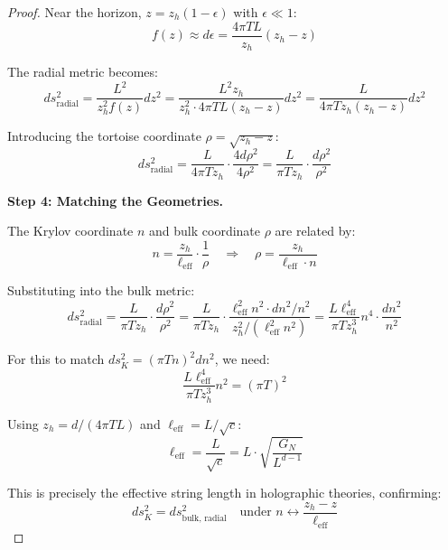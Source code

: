 \documentclass[12pt,a4paper]{article}
\begin{document}
\begin{proof}
Near the horizon, $z = z_h(1 - \epsilon)$ with $\epsilon \ll 1$:
\begin{equation}
f(z) \approx d \epsilon = \frac{4\pi T L}{z_h} (z_h - z)
\end{equation}

The radial metric becomes:
\begin{equation}
ds^2_{\text{radial}} = \frac{L^2}{z_h^2 f(z)} dz^2 = \frac{L^2 z_h}{z_h^2 \cdot 4\pi T L (z_h - z)} dz^2 = \frac{L}{4\pi T z_h (z_h - z)} dz^2
\end{equation}

Introducing the tortoise coordinate $\rho = \sqrt{z_h - z}$:
\begin{equation}
ds^2_{\text{radial}} = \frac{L}{4\pi T z_h} \cdot \frac{4d\rho^2}{4\rho^2} = \frac{L}{\pi T z_h} \cdot \frac{d\rho^2}{\rho^2}
\end{equation}

\textbf{Step 4: Matching the Geometries.}

The Krylov coordinate $n$ and bulk coordinate $\rho$ are related by:
\begin{equation}
n = \frac{z_h}{\ell_{\text{eff}}} \cdot \frac{1}{\rho} \quad \Rightarrow \quad \rho = \frac{z_h}{\ell_{\text{eff}} \cdot n}
\end{equation}

Substituting into the bulk metric:
\begin{equation}
ds^2_{\text{radial}} = \frac{L}{\pi T z_h} \cdot \frac{d\rho^2}{\rho^2} = \frac{L}{\pi T z_h} \cdot \frac{\ell_{\text{eff}}^2 n^2 \cdot dn^2/n^2}{z_h^2/(\ell_{\text{eff}}^2 n^2)} = \frac{L \ell_{\text{eff}}^4}{\pi T z_h^3} n^4 \cdot \frac{dn^2}{n^2}
\end{equation}

For this to match $ds^2_K = (\pi T n)^2 dn^2$, we need:
\begin{equation}
\frac{L \ell_{\text{eff}}^4}{\pi T z_h^3} n^2 = (\pi T)^2
\end{equation}

Using $z_h = d/(4\pi T L)$ and $\ell_{\text{eff}} = L/\sqrt{c}$:
\begin{equation}
\ell_{\text{eff}} = \frac{L}{\sqrt{c}} = L \cdot \sqrt{\frac{G_N}{L^{d-1}}}
\end{equation}

This is precisely the effective string length in holographic theories, confirming:
\begin{equation}
\boxed{ds^2_K = ds^2_{\text{bulk, radial}} \quad \text{under } n \leftrightarrow \frac{z_h - z}{\ell_{\text{eff}}}}
\end{equation}
\end{proof}
\end{document}
